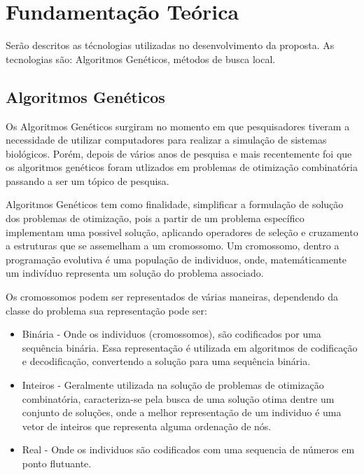 \documentclass[
	12pt,				%
	openright,			%
	twoside,			%
	a4paper,			%
	chapter=TITLE,		%
	section=TITLE,		%
	english,			%
	french,				%
	spanish,			%
	brazil				%
	]{abntex2}
\begin{document}



\chapter{Fundamentação Teórica}
Serão descritos as técnologias  utilizadas no desenvolvimento da proposta. As tecnologias são: Algoritmos Genéticos,
métodos de busca local.
\section{Algoritmos Genéticos}
Os Algoritmos Genéticos surgiram no momento em que pesquisadores tiveram a necessidade de utilizar computadores para 
realizar a simulação de sistemas biológicos. Porém, depois de vários anos de pesquisa e mais recentemente foi que os algoritmos genéticos foram utlizados em problemas de otimização combinatória passando a ser um tópico de pesquisa. 

Algoritmos Genéticos tem como finalidade, simplificar a formulação de solução dos problemas de otimização, pois a partir de um problema específico implementam uma possivel solução, aplicando operadores de seleção e cruzamento a estruturas que se assemelham a um cromossomo. Um cromossomo, dentro a programação evolutiva é uma população de individuos, onde, matemáticamente um indivíduo representa um solução do problema associado.

Os cromossomos podem  ser representados de várias maneiras, dependendo da classe do problema sua representação pode ser:
\begin{itemize}
\item Binária - Onde os individuos (cromossomos), são codificados por uma sequência binária. Essa representação é utilizada em algoritmos de codificação e decodificação, convertendo a solução para uma sequência binária.
\item Inteiros - Geralmente utilizada na solução de problemas de otimização combinatória, caracteriza-se pela busca de uma solução otima dentre um conjunto de soluções, onde a melhor representação de um individuo é uma vetor de inteiros que representa alguma ordenação de  nós.
\item Real -  Onde os individuos são codificados com uma sequencia de números em ponto flutuante.
\end{itemize}
\end{document}
